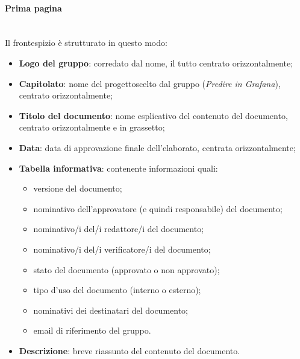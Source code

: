             \paragraph{Prima pagina}\mbox{}\\ [1mm]
                Il frontespizio è strutturato in questo modo:
                \begin{itemize}
                    \item \textbf{Logo del gruppo}: corredato dal nome, il tutto centrato orizzontalmente;
                    \item \textbf{Capitolato}\glo: nome del progetto\glosp scelto dal gruppo (\textit{Predire in Grafana}), centrato orizzontalmente;
                    \item \textbf{Titolo del documento}: nome esplicativo del contenuto del documento, centrato orizzontalmente e in grassetto;
                    \item \textbf{Data}: data di approvazione finale dell'elaborato, centrata orizzontalmente;
                    \item \textbf{Tabella informativa}: contenente informazioni quali:
                    \begin{itemize}
                        \item versione del documento;
                        \item nominativo dell'approvatore (e quindi responsabile) del documento;
                        \item nominativo/i del/i redattore/i del documento;
                        \item nominativo/i del/i verificatore/i del documento;
                        \item stato del documento (approvato o non approvato);
                        \item tipo d'uso del documento (interno o esterno);
                        \item nominativi dei destinatari del documento;
                        \item email di riferimento del gruppo.
                    \end{itemize} 
                    \item \textbf{Descrizione}: breve riassunto del contenuto del documento.
                \end{itemize}

